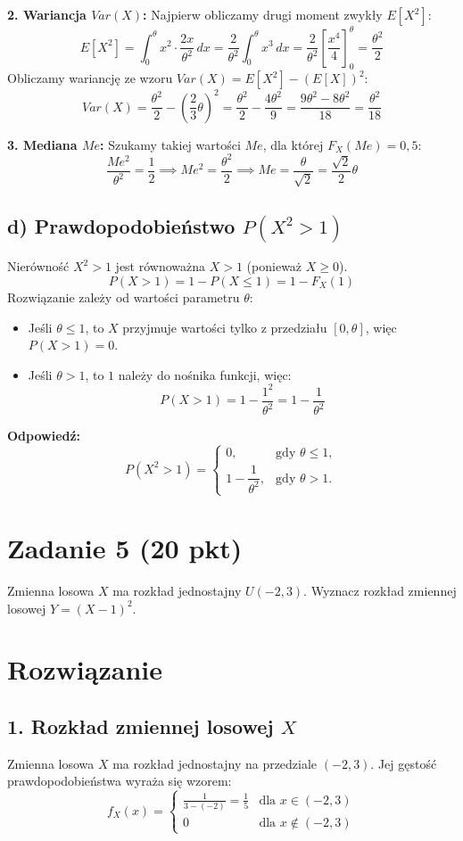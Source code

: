\documentclass[polish, 10pt]{extarticle}
\theoremstyle{definition}
\begin{document}
\textbf{2. Wariancja $Var(X)$:}
Najpierw obliczamy drugi moment zwykły $E[X^2]$:
\[
E[X^2] = \int_0^\theta x^2 \cdot \frac{2x}{\theta^2} \, dx = \frac{2}{\theta^2} \int_0^\theta x^3 \, dx = \frac{2}{\theta^2} \left[ \frac{x^4}{4} \right]_0^\theta = \frac{\theta^2}{2}
\]
Obliczamy wariancję ze wzoru $Var(X) = E[X^2] - (E[X])^2$:
\[
Var(X) = \frac{\theta^2}{2} - \left(\frac{2}{3}\theta\right)^2 = \frac{\theta^2}{2} - \frac{4\theta^2}{9} = \frac{9\theta^2 - 8\theta^2}{18} = \frac{\theta^2}{18}
\]

\textbf{3. Mediana $Me$:}
Szukamy takiej wartości $Me$, dla której $F_X(Me) = 0,5$:
\[
\frac{Me^2}{\theta^2} = \frac{1}{2} \implies Me^2 = \frac{\theta^2}{2} \implies Me = \frac{\theta}{\sqrt{2}} = \frac{\sqrt{2}}{2}\theta
\]

\subsection*{d) Prawdopodobieństwo $P(X^2 > 1)$}
Nierówność $X^2 > 1$ jest równoważna $X > 1$ (ponieważ $X \ge 0$).
\[
P(X > 1) = 1 - P(X \leq 1) = 1 - F_X(1)
\]
Rozwiązanie zależy od wartości parametru $\theta$:
\begin{itemize}
    \item Jeśli $\theta \leq 1$, to $X$ przyjmuje wartości tylko z przedziału $[0, \theta]$, więc $P(X > 1) = 0$.
    \item Jeśli $\theta > 1$, to $1$ należy do nośnika funkcji, więc:
    \[
    P(X > 1) = 1 - \frac{1^2}{\theta^2} = 1 - \frac{1}{\theta^2}
    \]
\end{itemize}

\noindent \textbf{Odpowiedź:}
\[
P(X^2 > 1) =
\begin{cases}
0, & \text{gdy } \theta \leq 1, \\[6pt]
1 - \dfrac{1}{\theta^2}, & \text{gdy } \theta > 1.
\end{cases}
\]

\section*{Zadanie 5 (20 pkt)}
Zmienna losowa $X$ ma rozkład jednostajny $U(-2, 3)$.
Wyznacz rozkład zmiennej losowej $Y = (X-1)^2$.

\section*{Rozwiązanie}

\subsection*{1. Rozkład zmiennej losowej \(X\)}
Zmienna losowa \(X\) ma rozkład jednostajny na przedziale \((-2, 3)\). Jej gęstość prawdopodobieństwa wyraża się wzorem:
\begin{equation}
    f_X(x) = \begin{cases} 
        \frac{1}{3 - (-2)} = \frac{1}{5} & \text{dla } x \in (-2, 3) \\
        0 & \text{dla } x \notin (-2, 3)
    \end{cases}
\end{equation}
\end{document}
